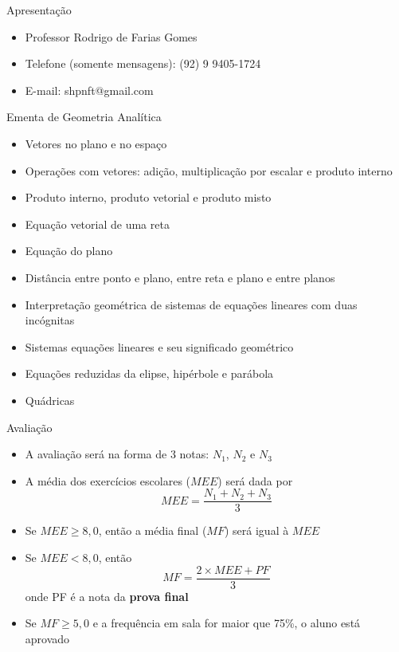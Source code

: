 \begin{frame}
    \titlepage
\end{frame}

\begin{frame}[c]{Apresentação}
    \begin{itemize}
        \item Professor Rodrigo de Farias Gomes
        \item Telefone (somente mensagens): (92) 9 9405-1724
        \item E-mail: shpnft@gmail.com
    \end{itemize}
\end{frame}

\begin{frame}{Ementa de Geometria Analítica}
    \begin{itemize}
        \item Vetores no plano e no espaço
        \item Operações com vetores: adição, multiplicação por escalar e produto interno
        \item Produto interno, produto vetorial e produto misto
        \item Equação vetorial de uma reta
        \item Equação do plano
        \item Distância entre ponto e plano, entre reta e plano e entre planos 
        \item Interpretação geométrica de sistemas de equações lineares com duas incógnitas
        \item Sistemas equações lineares e seu significado geométrico
        \item Equações reduzidas da elipse, hipérbole e parábola
        \item Quádricas 
    \end{itemize}
\end{frame}

\begin{frame}{Avaliação}
    \begin{itemize}
        \item A avaliação será na forma de 3 notas: \(N_1\), \(N_2\) e \(N_3\)
        \item A média dos exercícios escolares (\(MEE\)) será dada por
            \[
                MEE=\frac{N_1+N_2+N_3}{3}
            \]
        \item Se \(MEE \geq 8,0\), então a média final (\(MF\)) será igual à \(MEE\)
        \item Se \(MEE < 8,0\), então
            \[
                MF=\frac{2\times MEE+PF}{3}
            \]
            onde PF é a nota da \textbf{prova final}
        \item Se \(MF \geq 5,0\) e a frequência em sala for maior que 75\%, o aluno está aprovado
    \end{itemize}
\end{frame}

